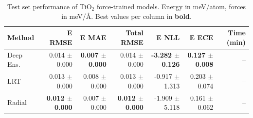 \begin{table}
\centering
\caption{Test set performance of TiO$_2$ force-trained models. Energy in meV/atom, forces in meV/\AA{}. Best values per column in \textbf{bold}.}
\label{tab:tio2_results}
\begin{tabular}{lrrrrrr}
\toprule
Method & E RMSE & E MAE & Total RMSE & E NLL & E ECE & Time (min) \\
\midrule
Deep Ens. & 0.014 $\pm$ 0.000 & \textbf{0.007 $\pm$ 0.000} & 0.014 $\pm$ 0.000 & \textbf{-3.282 $\pm$ 0.126} & \textbf{0.127 $\pm$ 0.008} & -- \\
LRT & 0.013 $\pm$ 0.000 & 0.008 $\pm$ 0.000 & 0.013 $\pm$ 0.000 & -0.917 $\pm$ 1.313 & 0.203 $\pm$ 0.074 & -- \\
Radial & \textbf{0.012 $\pm$ 0.000} & 0.007 $\pm$ 0.000 & \textbf{0.012 $\pm$ 0.000} & -1.909 $\pm$ 5.118 & 0.161 $\pm$ 0.062 & -- \\
\bottomrule
\end{tabular}
\end{table}